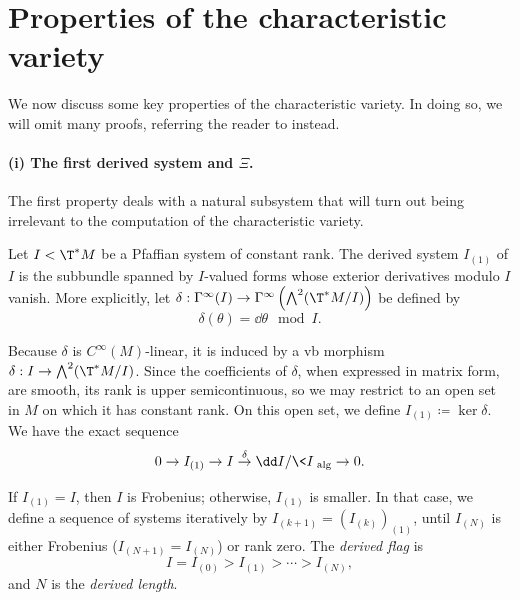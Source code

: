 




\section{Properties of the characteristic variety}

We now discuss some key properties of the characteristic variety. In doing so, we will omit many proofs, referring the reader to \cite[Ch.~V]{Bryant} instead.

\paragraph{(i) The first derived system and $\Xi$.} The first property deals with a natural subsystem that will turn out being irrelevant to the computation of the characteristic variety.

\begin{defn}
    Let $I<\T^\ast M$ be a Pfaffian system of constant rank. The derived system $I_{(1)}$ of $I$ is the subbundle spanned by $I$-valued forms whose exterior derivatives modulo $I$ vanish. More explicitly, let $\delta:\Gamma^\infty(I)\to \Gamma^\infty\left(\bigwedge^2(\T^\ast M\slash I)\right)$ be defined by \[\delta(\theta)=\dd\theta\mod I.\] 
    
    Because $\delta$ is $C^\infty(M)$-linear, it is induced by a \gls{vb} morphism $\delta:I\to \bigwedge^2(\T^\ast M\slash I)$. Since the coefficients of $\delta$, when expressed in matrix form, are smooth, its rank is upper semicontinuous, so we may restrict to an open set in $M$ on which it has constant rank. On this open set, we define $I_{(1)}\coloneqq \ker\delta$. We have the exact sequence 
    \[0\to I_{(1)}\to I\overset{\delta}{\to}\dd I\slash \<I\>_{\mathrm{alg}}\to 0.\]
    
    If $I_{(1)}=I$, then $I$ is Frobenius; otherwise, $I_{(1)}$ is smaller. In that case, we define a sequence of systems iteratively by $I_{(k+1)}=(I_{(k)})_{(1)}$, until $I_{(N)}$ is either Frobenius ($I_{(N+1)}=I_{(N)}$) or rank zero. The \emph{derived flag} is 
    \[I=I_{(0)}> I_{(1)}>\cdots >I_{(N)},\]
    and $N$ is the \emph{derived length}.
\end{defn}


